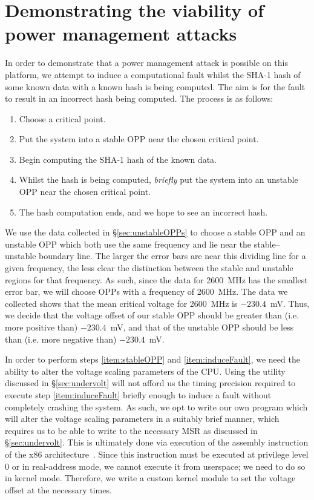 \section{Demonstrating the viability of power management attacks}
\label{sec:observing-fault}

In order to demonstrate that a power management attack is possible on this
platform, we attempt to induce a computational fault whilst the SHA-1 hash of
some known data with a known hash is being computed. The aim is for the fault
to result in an incorrect hash being computed. The process is as follows:

\begin{enumerate}
    \item Choose a critical point.
    \item \label{item:stableOPP} Put the system into a stable OPP near the
        chosen critical point.
    \item \label{item:beginSHA} Begin computing the SHA-1 hash of the known data.
    \item \label{item:induceFault} Whilst the hash is being computed,
        \emph{briefly} put the system into an unstable OPP near the chosen
        critical point.
    \item The hash computation ends, and we hope to see an incorrect hash.
\end{enumerate}

We use the data collected in §\ref{sec:unstableOPPs} to choose a stable OPP and
an unstable OPP which both use the same frequency and lie near the
stable–unstable boundary line. The larger the error bars are near this dividing
line for a given frequency, the less clear the distinction between the stable and
unstable regions for that frequency. As such, since the data for 2600~MHz has
the smallest error bar, we will choose OPPs with a frequency of 2600~MHz.
The data we collected shows that the mean critical voltage for 2600~MHz
is $-230.4$~mV. Thus, we decide that the voltage offset of our stable OPP
should be greater than (i.e. more positive than) $-230.4$~mV, and that of the
unstable OPP should be less than (i.e. more negative than) $-230.4$~mV.

In order to perform steps \ref{item:stableOPP} and \ref{item:induceFault}, we
need the ability to alter the voltage scaling parameters of the CPU. Using the
 utility discussed in §\ref{sec:undervolt} will not afford us the
timing precision required to execute step \ref{item:induceFault} briefly enough
to induce a fault without completely crashing the system. As such, we opt to
write our own program which will alter the voltage scaling parameters in a
suitably brief manner, which requires us to be able to write to the necessary
MSR as discussed in §\ref{sec:undervolt}. This is ultimately done via execution
of the  assembly instruction of the x86
architecture~\cite[Vol. 2, §4.4]{intelDevManual}. Since this instruction
must be executed at privilege level 0 or in real-address mode, we cannot
execute it from userspace; we need to do so in kernel mode. Therefore, we write
a custom kernel module to set the voltage offset at the necessary times.

